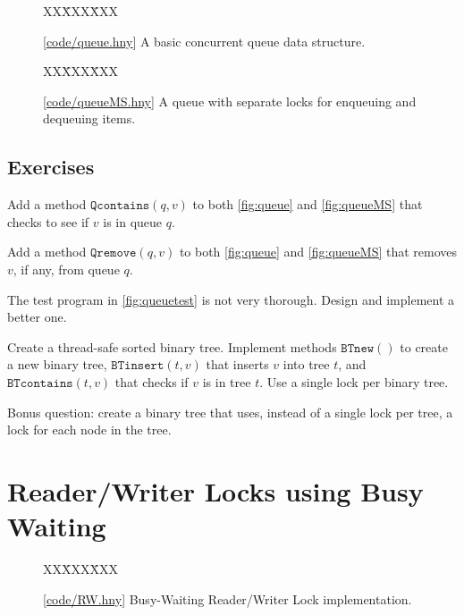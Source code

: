 \documentclass{report}
\newcommand{\harmonysource}[1]{
\begin{tabbing}
XX\=XXX\=XXX\kill
    
\end{tabbing}
}
\newcommand{\harmonylink}[1]{%
[\href{https://www.cs.cornell.edu/home/rvr/harmony/#1}{\underline{#1}}]%
}
\newenvironment{code}{
\tcolorbox
}{
\endtcolorbox
}
\begin{document}
\begin{figure}
\begin{code}
\harmonysource{queue}
\end{code}
\caption{\harmonylink{code/queue.hny}A basic concurrent queue data structure.}
\label{fig:queue}
\end{figure}

\begin{figure}
\begin{code}
\harmonysource{queueMS}
\end{code}
\caption{\harmonylink{code/queueMS.hny} A queue with separate locks for enqueuing and dequeuing items.}
\label{fig:queueMS}
\end{figure}

\section*{Exercises}
\begin{problems}
\item \label{ex:qcontains} Add a method $\mathtt{Qcontains}(q, v)$ to both \autoref{fig:queue} and \autoref{fig:queueMS}
that checks to see if $v$ is in queue $q$.
\item Add a method $\mathtt{Qremove}(q, v)$ to both \autoref{fig:queue} and \autoref{fig:queueMS}
that removes $v$, if any, from queue $q$.
\item The test program in \autoref{fig:queuetest} is not very thorough.  Design
and implement a better one.
\item Create a thread-safe sorted binary tree.  Implement methods
$\mathtt{BTnew}()$ to create a new binary tree, $\mathtt{BTinsert}(t, v)$ that inserts $v$ into
tree $t$, and $\mathtt{BTcontains}(t, v)$ that checks if $v$ is in tree $t$.  Use a single
lock per binary tree.
\item Bonus question: create a binary tree that uses, instead of a single lock per tree,
a lock for each node in the tree.
\end{problems}

\chapter{Reader/Writer Locks using Busy Waiting}
\label{ch:rdwrbusy}
%

%

\begin{figure}
\begin{code}
\harmonysource{RW}
\end{code}
\caption{\harmonylink{code/RW.hny} Busy-Waiting Reader/Writer Lock implementation.}
\label{fig:rwbusy}
\end{figure}
\end{document}
